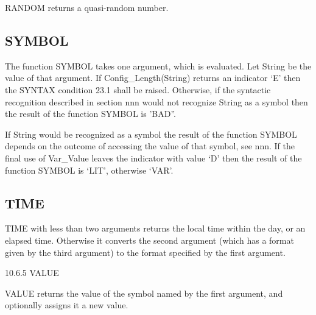 RANDOM returns a quasi-random number.



\subsection{SYMBOL}\label{symbol-1}

The function SYMBOL takes one argument, which is evaluated. Let String
be the value of that argument. If Config\_Length(String) returns an
indicator `E' then the SYNTAX condition 23.1 shall be raised. Otherwise,
if the syntactic recognition described in section nnn would not
recognize String as a symbol then the result of the function SYMBOL is
'BAD''.

If String would be recognized as a symbol the result of the function
SYMBOL depends on the outcome of accessing the value of that symbol, see
nnn. If the final use of Var\_Value leaves the indicator with value `D'
then the result of the function SYMBOL is `LIT', otherwise `VAR'.

\subsection{TIME}\label{time-1}

TIME with less than two arguments returns the local time within the day,
or an elapsed time. Otherwise it converts the second argument (which has
a format given by the third argument) to the format specified by the
first argument.



10.6.5 VALUE

VALUE returns the value of the symbol named by the first argument, and
optionally assigns it a new value.



